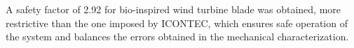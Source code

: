 A safety factor of 2.92 for bio-inspired wind turbine blade was obtained, more restrictive than the one imposed by ICONTEC, which ensures safe operation of the system and balances the errors obtained in the mechanical characterization.
%
%




%
%



